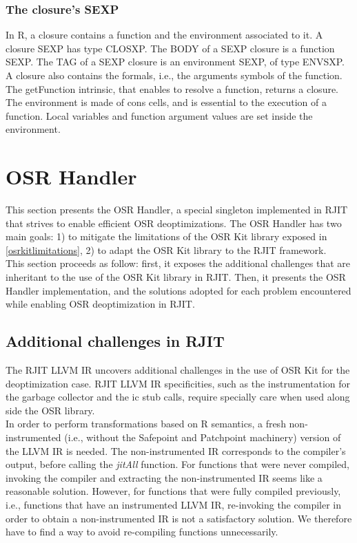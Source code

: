 \subsubsection{The closure's SEXP}
In R, a closure contains a function and the environment associated to it.
A closure SEXP has type CLOSXP.
The BODY of a SEXP closure is a function SEXP.
The TAG of a SEXP closure is an environment SEXP, of type ENVSXP.
A closure also contains the formals, i.e., the arguments symbols of the function.
The getFunction intrinsic, that enables to resolve a function, returns a closure.
The environment is made of cons cells, and is essential to the execution of a function.
Local variables and function argument values are set inside the environment.\\


\section{OSR Handler}
This section presents the OSR Handler, a special singleton implemented in RJIT that strives to enable efficient OSR deoptimizations. 
The OSR Handler has two main goals: 1) to mitigate the limitations of the OSR Kit\cite{OSRKit} library exposed in \ref{osrkitlimitations}, 2) to adapt the OSR Kit library to the RJIT framework.\\

This section proceeds as follow: first, it exposes the additional challenges that are inheritant to the use of the OSR Kit library in RJIT.
Then, it presents the OSR Handler implementation, and the solutions adopted for each problem encountered while enabling OSR deoptimization in RJIT.\\
 
\subsection{Additional challenges in RJIT}\label{additionalchallenges}

The RJIT LLVM IR uncovers additional challenges in the use of OSR Kit\cite{OSRKit} for the deoptimization case.
RJIT LLVM IR specificities, such as the instrumentation for the garbage collector and the ic stub calls, require specially care when used along side the OSR library.\\

In order to perform transformations based on R semantics, a fresh non-instrumented (i.e., without the Safepoint and Patchpoint machinery) version of the LLVM IR is needed.
The non-instrumented IR corresponds to the compiler's output, before calling the \textit{jitAll} function.
For functions that were never compiled, invoking the compiler and extracting the non-instrumented IR seems like a reasonable solution.
However, for functions that were fully compiled previously, i.e., functions that have an instrumented LLVM IR, re-invoking the compiler in order to obtain a non-instrumented IR is not a satisfactory solution.
We therefore have to find a way to avoid re-compiling functions unnecessarily.\\

